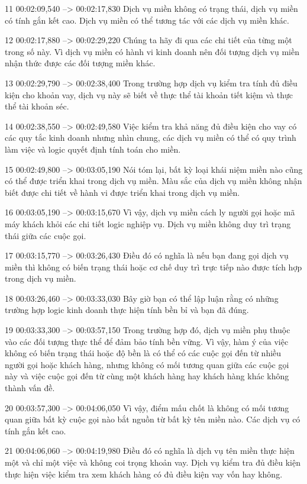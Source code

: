 11
00:02:09,540 --> 00:02:17,830
Dịch vụ miền không có trạng thái, dịch vụ miền có tính gắn kết cao.  Dịch vụ miền có thể tương tác với các dịch vụ miền khác.

12
00:02:17,880 --> 00:02:29,220
Chúng ta hãy đi qua các chi tiết của từng một trong số này.  Vì dịch vụ miền có hành vi kinh doanh nên đối tượng dịch vụ miền nhận thức được các đối tượng miền khác.

13
00:02:29,790 --> 00:02:38,400
Trong trường hợp dịch vụ kiểm tra tính đủ điều kiện cho khoản vay, dịch vụ này sẽ biết về thực thể tài khoản tiết kiệm và thực thể tài khoản séc.

14
00:02:38,550 --> 00:02:49,580
Việc kiểm tra khả năng đủ điều kiện cho vay có các quy tắc kinh doanh nhưng nhìn chung, các dịch vụ miền có thể có quy trình làm việc và logic quyết định tính toán cho miền.

15
00:02:49,800 --> 00:03:05,190
Nói tóm lại, bất kỳ loại khái niệm miền nào cũng có thể được triển khai trong dịch vụ miền.  Màu sắc của dịch vụ miền không nhận biết được chi tiết về hành vi được triển khai trong dịch vụ miền.

16
00:03:05,190 --> 00:03:15,670
Vì vậy, dịch vụ miền cách ly người gọi hoặc mã máy khách khỏi các chi tiết logic nghiệp vụ.  Dịch vụ miền không duy trì trạng thái giữa các cuộc gọi.

17
00:03:15,770 --> 00:03:26,430
Điều đó có nghĩa là nếu bạn đang gọi dịch vụ miền thì không có biến trạng thái hoặc cơ chế duy trì trực tiếp nào được tích hợp trong dịch vụ miền.

18
00:03:26,460 --> 00:03:33,030
Bây giờ bạn có thể lập luận rằng có những trường hợp logic kinh doanh thực hiện tính bền bỉ và bạn đã đúng.

19
00:03:33,300 --> 00:03:57,150
Trong trường hợp đó, dịch vụ miền phụ thuộc vào các đối tượng thực thể để đảm bảo tính bền vững.  Vì vậy, hàm ý của việc không có biến trạng thái hoặc độ bền là có thể có các cuộc gọi đến từ nhiều người gọi hoặc khách hàng, nhưng không có mối tương quan giữa các cuộc gọi này và việc cuộc gọi đến từ cùng một khách hàng hay khách hàng khác không thành vấn đề.

20
00:03:57,300 --> 00:04:06,050
Vì vậy, điểm mấu chốt là không có mối tương quan giữa bất kỳ cuộc gọi nào bắt nguồn từ bất kỳ tên miền nào.  Các dịch vụ có tính gắn kết cao.

21
00:04:06,060 --> 00:04:19,980
Điều đó có nghĩa là dịch vụ tên miền thực hiện một và chỉ một việc và không coi trọng khoản vay.  Dịch vụ kiểm tra đủ điều kiện thực hiện việc kiểm tra xem khách hàng có đủ điều kiện vay vốn hay không.

